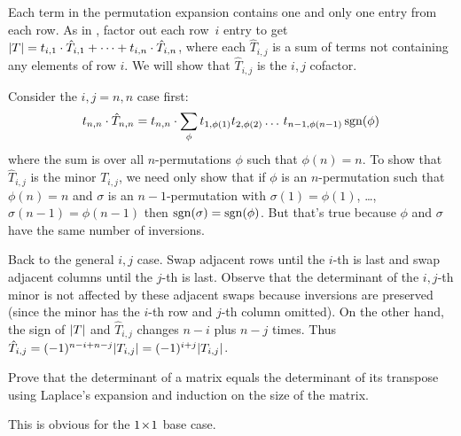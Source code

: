 \begin{exercises}
\begin{answer}
      Each term in the permutation expansion contains one and
      only one entry from each row.
      As in ,
      factor out each row~$i$ entry to get
      \( \deter{T}
           =t_{i,1}\cdot\hat{T}_{i,1}+\dots+t_{i,n}\cdot\hat{T}_{i,n} \),
      where each \( \hat{T}_{i,j} \) is a sum of terms not containing any
      elements of row \( i \).
      We will show that \( \hat{T}_{i,j} \) is the \( i,j \) cofactor.

      Consider the \( i,j=n,n \) case first:
      \begin{equation*}
        t_{n,n}\cdot\hat{T}_{n,n}
        =t_{n,n}\cdot
            \sum_{\phi}t_{1,\phi(1)}t_{2,\phi(2)}\dots\,t_{n-1,\phi(n-1)}
                      \operatorname{sgn}(\phi)
      \end{equation*}
      where the sum is over all \( n \)-permutations \( \phi \) such that
      \( \phi(n)=n \).
      To show that 
      \( \hat{T}_{i,j} \) is the minor \( T_{i,j} \), we need only show
      that if \( \phi \) is an \( n \)-permutation such that 
      \( \phi(n)=n \) and
      \( \sigma \) is an \( n-1 \)-permutation with
      \( \sigma(1)=\phi(1) \), \ldots, \( \sigma(n-1)=\phi(n-1) \)
      then \( \operatorname{sgn}(\sigma)=\operatorname{sgn}(\phi) \).
      But that's true because $\phi$ and $\sigma$ 
      have the same number of inversions.

      Back to the general \( i,j \) case.
      Swap adjacent rows until the \( i \)-th is last and swap adjacent
      columns until the \( j \)-th is last.
      Observe that the determinant of the \( i,j \)-th minor is not affected by
      these adjacent
      swaps because inversions are preserved (since the minor has the
      \( i \)-th row and \( j \)-th column omitted).
      On the other hand, the sign of \( \deter{T} \) and \( \hat{T}_{i,j} \)
      changes \( n-i \) plus \( n-j \) times.
      Thus \( \hat{T}_{i,j}=(-1)^{n-i+n-j}\deter{T_{i,j}}
                =(-1)^{i+j}\deter{T_{i,j}} \).  
    \end{answer}
  \item 
    Prove that the determinant of a matrix equals the determinant of its
    transpose using Laplace's expansion and induction on the size 
    of the matrix.
    \begin{answer}
      This is obvious for the \( 1 \! \times \! 1 \) base case.


\end{answer}
\end{exercises}

